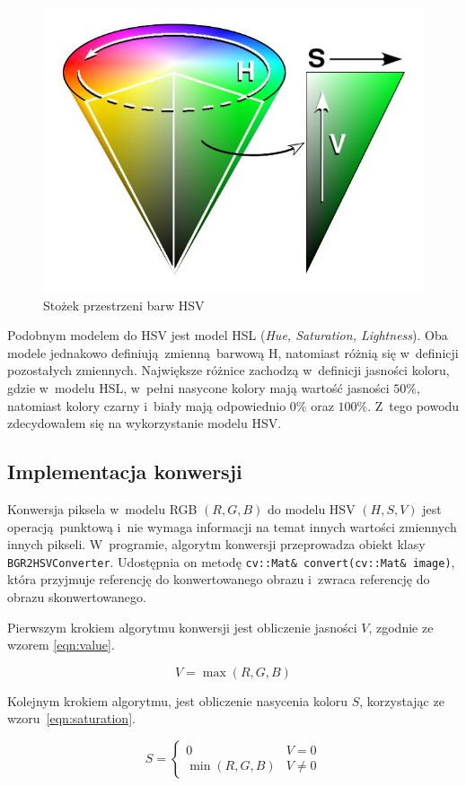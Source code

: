 \begin{figure}
    \centering
    \includegraphics[width=0.6\columnwidth]{./figures/HSV_cone.jpg}
    \caption{Stożek przestrzeni barw HSV~\cite{WikipediaPL:hsvCone}}
\end{figure}   

Podobnym modelem do HSV jest model HSL (\textit{Hue, Saturation, Lightness}). Oba modele jednakowo definiują zmienną barwową H, natomiast różnią się w~definicji pozostałych zmiennych. Największe różnice zachodzą w~definicji jasności koloru, gdzie w~modelu HSL, w~pełni nasycone kolory mają wartość jasności $50\%$, natomiast kolory czarny i~biały mają odpowiednio $0\%$ oraz $100\%$. Z~tego powodu zdecydowałem się na wykorzystanie modelu HSV.

\subsection{Implementacja konwersji}
Konwersja piksela w~modelu RGB $(R, G, B)$ do modelu HSV $(H,S,V)$ jest operacją punktową i~nie wymaga informacji na temat innych wartości zmiennych innych pikseli. W~programie, algorytm konwersji przeprowadza obiekt klasy \texttt{BGR2HSVConverter}. Udostępnia on metodę \texttt{cv::Mat\& convert(cv::Mat\& image)}, która przyjmuje referencję do konwertowanego obrazu i~zwraca referencję do obrazu skonwertowanego.

Pierwszym krokiem algorytmu konwersji jest obliczenie jasności $V$, zgodnie ze wzorem \ref{eqn:value}.

\begin{equation}
    \label{eqn:value}
    V = \max{(R, G, B)}
\end{equation}

Kolejnym krokiem algorytmu, jest obliczenie nasycenia koloru $S$, korzystając ze wzoru~\ref{eqn:saturation}.

\begin{equation}
    \label{eqn:saturation}
    S = \left\{ 
        \begin{array}{ll}
            0 & V = 0 \\
            \min{(R, G, B)} & V \ne 0
        \end{array} 
        \right.
\end{equation}

